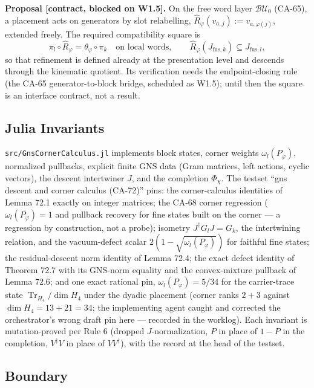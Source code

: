 \textbf{Proposal [contract, blocked on W1.5].}  On the free word layer
\(\mathcal{BU}_0\) (CA-65), a placement acts on generators by slot
relabelling, \(\widehat R_\varphi(v_{a,j}):=v_{a,\varphi(j)}\), extended
freely.  The required compatibility square is
\[
  \pi_l\circ\widehat R_\varphi=\theta_\varphi\circ\pi_k
  \quad\text{on local words},
  \qquad
  \widehat R_\varphi(J_{\mathrm{fus},k})\subseteq J_{\mathrm{fus},l},
\]
so that refinement is defined already at the presentation level and
descends through the kinematic quotient.  Its verification needs the
endpoint-closing rule (the CA-65 generator-to-block bridge, scheduled as
W1.5); until then the square is an interface contract, not a result.

\subsection{Julia Invariants}

\texttt{src/GnsCornerCalculus.jl} implements block states, corner weights
\(\omega_l(P_\varphi)\), normalized pullbacks, explicit finite GNS data
(Gram matrices, left actions, cyclic vectors), the descent intertwiner
\(J\), and the completion \(\Phi_\chi\).  The testset ``gns descent and
corner calculus (CA-72)'' pins: the corner-calculus identities of Lemma
72.1 exactly on integer matrices; the CA-68 corner regression
(\(\omega_l(P_\varphi)=1\) and pullback recovery for fine states built on
the corner --- a regression by construction, not a probe); isometry
\(J^\dagger G_lJ=G_k\), the intertwining relation, and the vacuum-defect
scalar \(2(1-\sqrt{\omega_l(P_\varphi)})\) for faithful fine states; the
residual-descent norm identity of Lemma 72.4; the exact defect identity of
Theorem 72.7 with its GNS-norm equality and the convex-mixture pullback of
Lemma 72.6; and one exact rational pin, \(\omega_l(P_\varphi)=5/34\) for
the carrier-trace state \(\operatorname{Tr}_{H_4}/\dim H_4\) under the
dyadic placement (corner ranks \(2+3\) against
\(\dim H_4=13+21=34\); the implementing agent caught and corrected the
orchestrator's wrong draft pin here --- recorded in the worklog).  Each
invariant is mutation-proved per Rule 6 (dropped \(J\)-normalization,
\(P\) in place of \(1-P\) in the completion, \(V^\dagger V\) in place of
\(VV^\dagger\)), with the record at the head of the testset.

\subsection{Boundary}


